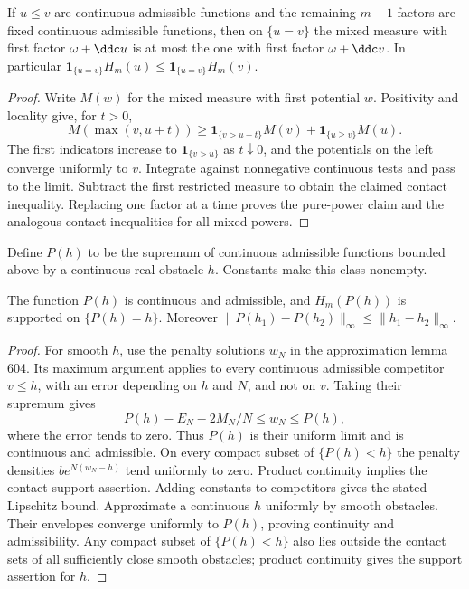 \begin{lemma}\label{draft:605-contact-comparison}
If $u\leq v$ are continuous admissible functions and the remaining
$m-1$ factors are fixed continuous admissible functions, then on
$\{u=v\}$ the mixed measure with first factor $\omega+\ddc u$ is at
most the one with first factor $\omega+\ddc v$.
In particular $\mathbf1_{\{u=v\}}H_m(u)\leq
\mathbf1_{\{u=v\}}H_m(v)$.
\end{lemma}
\begin{proof}
Write $M(w)$ for the mixed measure with first potential $w$.
Positivity and locality give, for $t>0$,
\[
 M(\max(v,u+t))\geq
 \mathbf1_{\{v>u+t\}}M(v)+\mathbf1_{\{u\geq v\}}M(u).
\]
The first indicators increase to $\mathbf1_{\{v>u\}}$ as $t\downarrow0$,
and the potentials on the left converge uniformly to $v$.
Integrate against nonnegative continuous tests and pass to the limit.
Subtract the first restricted measure to obtain the claimed contact
inequality. Replacing one factor at a time proves the pure-power claim
and the analogous contact inequalities for all mixed powers.
\end{proof}

Define $P(h)$ to be the supremum of continuous admissible functions
bounded above by a continuous real obstacle $h$. Constants make this
class nonempty.

\begin{lemma}\label{draft:605-continuous-obstacle-envelope}
The function $P(h)$ is continuous and admissible, and $H_m(P(h))$ is
supported on $\{P(h)=h\}$. Moreover
$\|P(h_1)-P(h_2)\|_\infty\leq\|h_1-h_2\|_\infty$.
\end{lemma}
\begin{proof}
For smooth $h$, use the penalty solutions $w_N$ in the approximation
lemma 604. Its maximum argument applies to every continuous admissible
competitor $v\leq h$, with an error depending on $h$ and $N$, and not
on $v$. Taking their supremum gives
\[
 P(h)-E_N-2M_N/N\leq w_N\leq P(h),
\]
where the error tends to zero. Thus $P(h)$ is their uniform limit and
is continuous and admissible. On every compact subset of
$\{P(h)<h\}$ the penalty densities
$b e^{N(w_N-h)}$ tend uniformly to zero. Product continuity implies
the contact support assertion.
Adding constants to competitors gives the stated Lipschitz bound.
Approximate a continuous $h$ uniformly by smooth obstacles. Their
envelopes converge uniformly to $P(h)$, proving continuity and
admissibility. Any compact subset of $\{P(h)<h\}$ also lies outside the
contact sets of all sufficiently close smooth obstacles; product
continuity gives the support assertion for $h$.
\end{proof}

